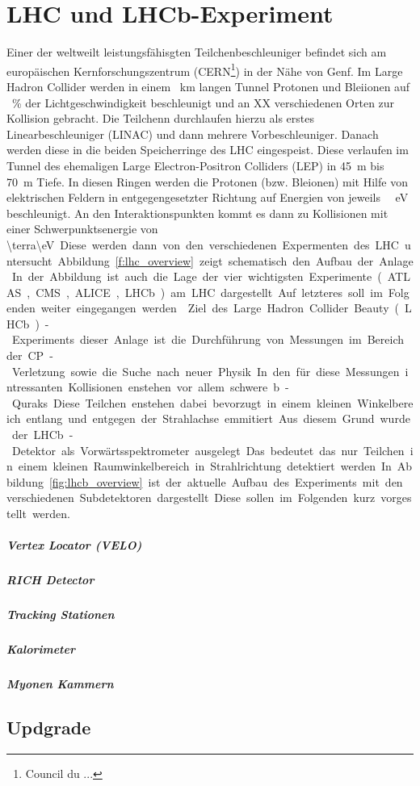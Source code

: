 \chapter{LHC und LHCb-Experiment}
Einer der weltweilt leistungsfähisgten Teilchenbeschleuniger befindet sich am
europäischen Kernforschungszentrum (CERN\footnote{Council du ...}) in der Nähe
von Genf. Im Large Hadron Collider werden in einem \SI{}{\kilo\meter} langen
Tunnel Protonen und Bleiionen auf \SI{}{\percent} der Lichtgeschwindigkeit
beschleunigt und an XX verschiedenen Orten zur Kollision gebracht. 
Die Teilchenn durchlaufen hierzu als erstes Linearbeschleuniger (LINAC) und
dann mehrere Vorbeschleuniger. Danach werden diese in die beiden Speicherringe
des LHC eingespeist. Diese verlaufen im Tunnel des ehemaligen Large
Electron-Positron Colliders (LEP) in \SI{45}{\meter} bis
\SI{70}{\meter}\cite{evans}
Tiefe. In diesen Ringen werden die Protonen (bzw. Bleionen) mit Hilfe von
elektrischen Feldern in entgegengesetzter Richtung  auf Energien von jeweils
\SI{}{\terra\eV} beschleunigt. An den Interaktionspunkten kommt es dann zu
Kollisionen mit einer Schwerpunktsenergie von \SI{\terra\eV}. Diese werden dann
von den verschiedenen Expermenten des LHC untersucht. Abbildung
\ref{f:lhc_overview} zeigt schematisch den Aufbau der Anlage. In der Abbildung
ist auch die Lage der vier wichtigsten Experimente (ATLAS, CMS, ALICE, LHCb) am
LHC dargestellt. Auf letzteres soll im Folgenden weiter eingegangen werden.
\noindent
Ziel des Large Hadron Collider Beauty (LHCb)-Experiments dieser Anlage ist die Durchführung
von Messungen im Bereich der CP-Verletzung sowie die Suche nach neuer Physik.
In den für diese Messungen intressanten Kollisionen enstehen vor allem schwere
b-Quraks. Diese Teilchen enstehen dabei bevorzugt in einem kleinen
Winkelbereich entlang und entgegen der Strahlachse emmitiert. Aus diesem Grund
wurde der LHCb-Detektor als Vorwärtsspektrometer ausgelegt. Das bedeutet das
nur Teilchen in einem kleinen Raumwinkelbereich in Strahlrichtung detektiert
werden.
In Abbildung \ref{fig:lhcb_overview} ist der aktuelle Aufbau des Experiments mit den
verschiedenen Subdetektoren dargestellt. Diese sollen im Folgenden kurz
vorgestellt werden. 
\paragraph{Vertex Locator (VELO)}
\paragraph{RICH Detector}
\paragraph{Tracking Stationen}
\paragraph{Kalorimeter}
\paragraph{Myonen Kammern}
\section{Updgrade}



